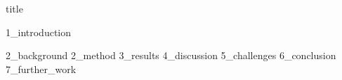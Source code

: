 \documentclass{article}
\begin{document}
{title}

\frontmatter

\tableofcontents


\mainmatter


{1_introduction}

{2_background}
{2_method}
{3_results}
{4_discussion}
{5_challenges}
{6_conclusion}
{7_further_work}
\newpage



\end{document}
